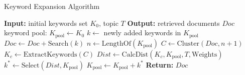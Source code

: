 

\begin{algorithm}
\caption{Keyword Expansion Algorithm}
\begin{algorithmic}[1]
\small
\STATE \textbf{Input:} initial keywords set $K_0$, topic $T$
\STATE \textbf{Output:} retrieved documents $Doc$
\STATE keyword pool: $K_{\text{pool}} \leftarrow K_0$
    \STATE $k \leftarrow$ newly added keywords in $K_{\text{pool}}$
    \STATE $Doc \leftarrow Doc + \text{Search}(k)$
    \STATE $n \leftarrow \text{LengthOf}(K_{\text{pool}})$
    \STATE $C \leftarrow \text{Cluster}(Doc, n+1)$
    \STATE $K_{c} \leftarrow \text{ExtractKeywords}(C)$
    \STATE $Dist \leftarrow \text{CalcDist}(K_{c}, K_{\text{pool}}, T, \text{Weights})$
    \STATE $k^* \leftarrow \text{Select}(Dist, K_{\text{pool}})$ 
    \STATE $K_{\text{pool}} \leftarrow K_{\text{pool}} + k^*$
\ENDWHILE
\STATE \textbf{Return:} $Doc$
\end{algorithmic}
\label{keyword_Expansion_algo}
\end{algorithm}

